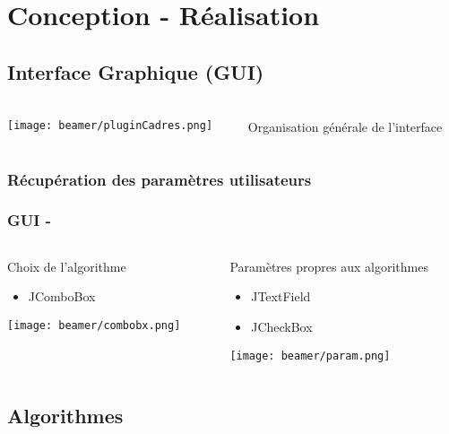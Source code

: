 \documentclass[11pt]{beamer}
\begin{document}
\section{Conception - Réalisation}
\subsection{Interface Graphique (GUI)}
\begin{frame}
\frametitle{\subsecname}
	\begin{columns}
		\begin{column}{6cm}
			\texttt{[image: beamer/pluginCadres.png]}
		\end{column}
		\begin{column}{4cm}
			Organisation générale de l'interface
		\end{column}
	\end{columns}
\end{frame}
\subsubsection*{Récupération des paramètres utilisateurs}
\begin{frame}
\frametitle{GUI - \subsubsecname}
	\begin{columns}[t]
		\begin{column}{5cm}
			\begin{block}{Choix de l'algorithme}
				\begin{itemize}
					\item JComboBox
				\end{itemize}
			\end{block}
			\vspace*{2cm}
			\texttt{[image: beamer/combobx.png]}
		\end{column}
		\begin{column}{5cm}
			\begin{block}{Paramètres propres aux algorithmes}
				\begin{itemize}
					\item JTextField
					\item JCheckBox
				\end{itemize}
			\end{block}
			\texttt{[image: beamer/param.png]}
		\end{column}
	\end{columns}
\end{frame}
\subsection{Algorithmes}
\end{document}

